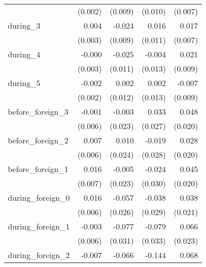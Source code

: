{\begin{tabular}{l*{4}{D{.}{.}{-1}}}
            &     (0.002)         &     (0.009)         &     (0.010)         &     (0.007)         \\
[1em]
during\_3    &       0.004         &      -0.024\sym{**} &       0.016         &       0.017\sym{**} \\
            &     (0.003)         &     (0.009)         &     (0.011)         &     (0.007)         \\
[1em]
during\_4    &      -0.000         &      -0.025\sym{**} &      -0.004         &       0.021\sym{**} \\
            &     (0.003)         &     (0.011)         &     (0.013)         &     (0.009)         \\
[1em]
during\_5    &      -0.002         &       0.002         &       0.002         &      -0.007         \\
            &     (0.002)         &     (0.012)         &     (0.013)         &     (0.009)         \\
[1em]
before\_foreign\_3&      -0.001         &      -0.003         &       0.033         &       0.048\sym{**} \\
            &     (0.006)         &     (0.023)         &     (0.027)         &     (0.020)         \\
[1em]
before\_foreign\_2&       0.007         &       0.010         &      -0.019         &       0.028         \\
            &     (0.006)         &     (0.024)         &     (0.028)         &     (0.020)         \\
[1em]
before\_foreign\_1&       0.016\sym{**} &      -0.005         &      -0.024         &       0.045\sym{**} \\
            &     (0.007)         &     (0.023)         &     (0.030)         &     (0.020)         \\
[1em]
during\_foreign\_0&       0.016\sym{***}&      -0.057\sym{**} &      -0.038         &       0.038\sym{*}  \\
            &     (0.006)         &     (0.026)         &     (0.029)         &     (0.021)         \\
[1em]
during\_foreign\_1&      -0.003         &      -0.077\sym{**} &      -0.079\sym{**} &       0.066\sym{***}\\
            &     (0.006)         &     (0.031)         &     (0.033)         &     (0.023)         \\
[1em]
during\_foreign\_2&      -0.007         &      -0.066\sym{**} &      -0.144\sym{***}&       0.068\sym{**} \\

\end{tabular}}
